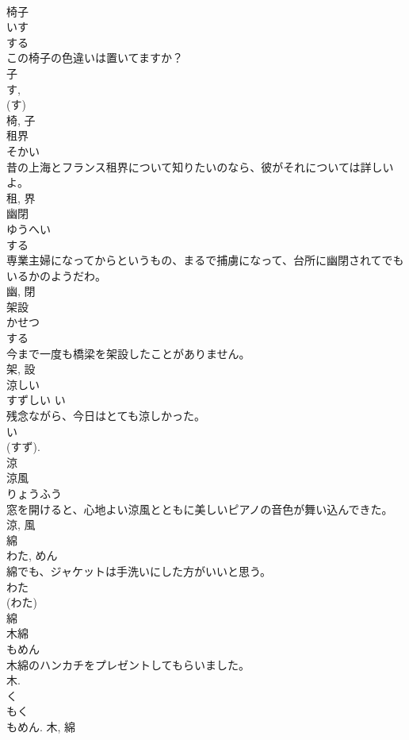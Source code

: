 \documentclass[8pt]{extreport}
\begin{document}
\begin{CJK}{UTF8}{min}
\\	椅子	
\\	いす	
\\	する 
\\	この椅子の色違いは置いてますか？	
\\	子 
\\	す, 
\\	(す) 
\\	椅, 子	
\\	租界	
\\	そかい	
\\	昔の上海とフランス租界について知りたいのなら、彼がそれについては詳しいよ。	
\\	租, 界	
\\	幽閉	
\\	ゆうへい	
\\	する 
\\	専業主婦になってからというもの、まるで捕虜になって、台所に幽閉されてでもいるかのようだわ。	
\\	幽, 閉	
\\	架設	
\\	かせつ	
\\	する 
\\	今まで一度も橋梁を架設したことがありません。	
\\	架, 設	
\\	涼しい	
\\	すずしい	い 
\\	残念ながら、今日はとても涼しかった。	
\\	い 
\\	(すず). 
\\	涼	
\\	涼風	
\\	りょうふう	
\\	窓を開けると、心地よい涼風とともに美しいピアノの音色が舞い込んできた。	
\\	涼, 風	
\\	綿	
\\	わた, めん	
\\	綿でも、ジャケットは手洗いにした方がいいと思う。	
\\	わた 
\\	(わた) 
\\	綿	
\\	木綿	
\\	もめん	
\\	木綿のハンカチをプレゼントしてもらいました。	
\\	木. 
\\	く 
\\	もく 
\\	もめん.	木, 綿	

\end{CJK}
\end{document}

